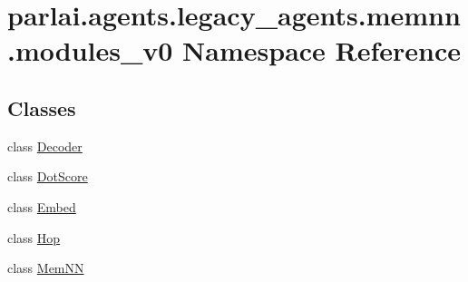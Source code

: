 \hypertarget{namespaceparlai_1_1agents_1_1legacy__agents_1_1memnn_1_1modules__v0}{}\section{parlai.\+agents.\+legacy\+\_\+agents.\+memnn.\+modules\+\_\+v0 Namespace Reference}
\label{namespaceparlai_1_1agents_1_1legacy__agents_1_1memnn_1_1modules__v0}
\subsection*{Classes}
\begin{DoxyCompactItemize}
\item 
class \hyperlink{classparlai_1_1agents_1_1legacy__agents_1_1memnn_1_1modules__v0_1_1Decoder}{Decoder}
\item 
class \hyperlink{classparlai_1_1agents_1_1legacy__agents_1_1memnn_1_1modules__v0_1_1DotScore}{Dot\+Score}
\item 
class \hyperlink{classparlai_1_1agents_1_1legacy__agents_1_1memnn_1_1modules__v0_1_1Embed}{Embed}
\item 
class \hyperlink{classparlai_1_1agents_1_1legacy__agents_1_1memnn_1_1modules__v0_1_1Hop}{Hop}
\item 
class \hyperlink{classparlai_1_1agents_1_1legacy__agents_1_1memnn_1_1modules__v0_1_1MemNN}{Mem\+NN}
\end{DoxyCompactItemize}
